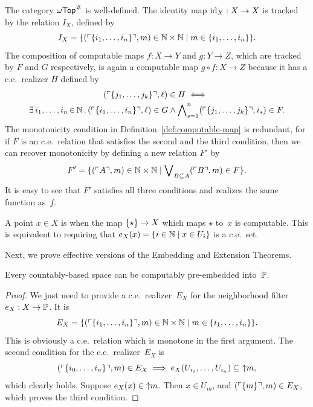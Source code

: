 The category $\mathsf{\omega Top}^{\#}$ is well-defined. The identity map $\mathrm{id}_X:
X \to X$ is tracked by the relation $I_X$, defined by
%
\begin{equation*}
  I_X = \{
    (\ulcorner \{i_1, \ldots, i_n\} \urcorner, m) \in \mathbb{N} \times \mathbb{N} \mid
    m \in \{i_1, \ldots, i_n\}
  \}.
\end{equation*}
%
The composition of computable maps $f: X \to Y$ and $g: Y \to Z$,
which are tracked by $F$ and $G$ respectively, is again a computable
map $g \circ f: X \to Z$ because it has a c.e.~realizer $H$ defined by
%
\begin{multline*}
  (\ulcorner \{j_1, \ldots, j_k\} \urcorner, \ell) \in H
  \iff {} \\
    \exists\, i_1, \ldots, i_n \,{\in}\, \mathbb{N}\,.\,
      (\ulcorner \{i_1, \ldots, i_n\} \urcorner, \ell) \in G \land
      \bigwedge\nolimits_{s = 1}^{n}
      (\ulcorner \{j_1, \ldots, j_k\} \urcorner, i_s) \in F
   .
\end{multline*}
%
The monotonicity condition in Definition~\ref{def:computable-map} is
redundant, for if $F$ is an c.e.~relation that satisfies the second
and the third condition, then we can recover monotonicity by defining
a new relation $F'$ by
%
\begin{equation*}
  F' = \{(\ulcorner A \urcorner, m) \in \mathbb{N} \times \mathbb{N} \mid
    \bigvee\nolimits_{B \subseteq A} (\ulcorner B \urcorner, m) \in F
  \}.
\end{equation*}
%
It is easy to see that $F'$ satisfies all three conditions and
realizes the same function as~$f$.

A point $x \in X$ is  when the map $\{\star\} \to
X$ which maps $\star$ to~$x$ is computable. This is equivalent to
requiring that $e_X(x) = \{i \in \mathbb{N} \mid x \in U_i\}$ is a
c.e.~set.

Next, we prove effective versions of the Embedding and Extension
Theorems.

\begin{theorem}
  \label{th:computable_embedding_theorem}%
  Every countably-based space can be computably pre-embedded
  into~$\mathbb{P}$.
\end{theorem}

\begin{proof}
  We just need to provide a c.e.~realizer~$E_X$ for the neighborhood
  filter $e_X : X \to \mathbb{P}$. It is
  \begin{equation*}
    E_X = \{
      (\ulcorner \{i_1, \ldots, i_n\} \urcorner, m) \in \mathbb{N} \times \mathbb{N} \mid
      m \in \{i_1, \ldots, i_n\}
    \}.
  \end{equation*}
  This is obviously a c.e.~relation which is monotone in the first
  argument. The second condition for the c.e.~realizer~$E_X$ is
  \begin{equation*}
     (\ulcorner \{i_0, \ldots, i_n\} \urcorner, m) \in E_X
     \implies
     e_X(U_{i_1}, \ldots, U_{i_n}) \subseteq {\uparrow}m,
  \end{equation*}
  which clearly holds.
  Suppose $e_X(x) \in {\uparrow}m$. Then $x \in U_m$, and
  $(\ulcorner \{m\} \urcorner, m) \in E_X$, which proves the third condition.
\end{proof}


